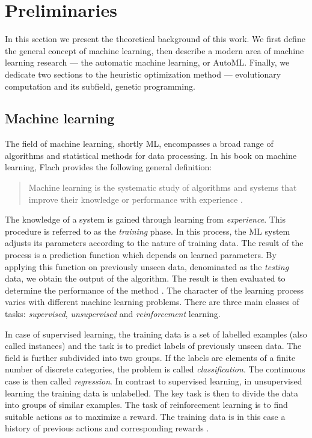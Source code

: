\chapter{Preliminaries}

In this section we present the theoretical background of this work. We first
define the general concept of machine learning, then describe a modern area
of machine learning research --- the automatic machine learning, or AutoML.
Finally, we dedicate two sections to the heuristic optimization method ---
evolutionary computation and its subfield, genetic programming.

\section{Machine learning}
The field of machine learning, shortly ML, encompasses a broad range of
algorithms and statistical methods for data processing. In his book on machine
learning, Flach provides the following general definition:

\blockquote{Machine learning is the systematic study of algorithms and systems
that improve their knowledge or performance with experience
\citep{Flach:2012:MLA:2490546}.}


The knowledge of a system is gained through learning from \emph{experience}.
This procedure is referred to as the \emph{training} phase. In this process, 
the ML system adjusts its parameters according to the nature of training data.
The result of the process is a prediction function which depends on learned
parameters. By applying this function on previously unseen data, denominated 
as the \emph{testing} data, we obtain the output of the algorithm. The 
result is then evaluated to determine the performance of the method 
\citep[p.~2]{Bishop:2006:PRM:1162264}. The character of the learning process
varies with different machine learning problems. There are three main classes 
of tasks: \emph{supervised}, \emph{unsupervised} and \emph{reinforcement} 
learning.

In case of supervised learning, the training data is a set of labelled examples
(also called instances)
and the task is to predict labels of previously unseen data. The field is 
further subdivided into two groups. If the labels are elements of a finite 
number of discrete categories, the problem is called \emph{classification}. 
The continuous case is then called \emph{regression}.
In contrast to supervised learning, in unsupervised learning the training data 
is unlabelled. The key task is then to divide the data into groups of 
similar examples. The task of reinforcement learning is to find suitable
actions as to maximize a reward. The training data is in this case a history of
previous actions and corresponding rewards \citep[p.~3]{Bishop:2006:PRM:1162264}.

